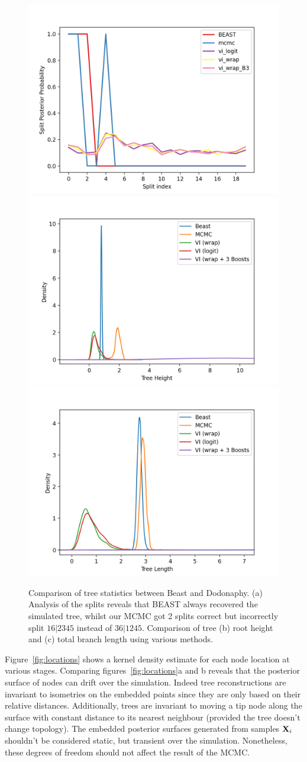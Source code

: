 \documentclass[11pt]{article}
\begin{document}
\begin{figure}[htbp]
\begin{center}
\includegraphics[width=.333\linewidth]{fig/cmp_splits}%
\includegraphics[width=.333\linewidth]{fig/cmp_height}%
\includegraphics[width=.333\linewidth]{fig/cmp_length}
\caption{Comparison of tree statistics between Beast and Dodonaphy. (a) Analysis of the splits reveals that BEAST always recovered the simulated tree, whilst our MCMC got 2 splits correct but incorrectly split $16|2345$ instead of $36|1245$. Comparison of tree (b) root height and (c) total branch length using various methods.}
\label{fig:stat_cmp}
\end{center}
\end{figure}

Figure~\ref{fig:locations} shows a kernel density estimate for each node location at various stages.
Comparing figures~\ref{fig:locations}a and b reveals that the posterior surface of nodes can drift over the simulation.
Indeed tree reconstructions are invariant to isometries on the embedded points since they are only based on their relative distances.
Additionally, trees are invariant to moving a tip node along the surface with constant distance to its nearest neighbour (provided the tree doesn't change topology).
The embedded posterior surfaces generated from samples $\bold{X}_{i}$ shouldn't be considered static, but transient over the simulation.
Nonetheless, these degrees of freedom should not affect the result of the MCMC.
\end{document}
